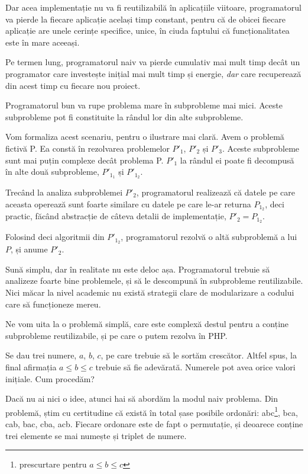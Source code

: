 Dar acea implementație nu va fi reutilizabilă în aplicațiile
viitoare, programatorul va pierde la fiecare aplicație
același timp constant, pentru că de obicei fiecare aplicație
are unele cerințe specifice, unice, în ciuda faptului că
funcționalitatea este în mare aceeași.

Pe termen lung, programatorul naiv va pierde cumulativ mai mult timp
decât un programator care investește inițial mai mult timp și
energie, \textit{dar} care recuperează din acest timp
cu fiecare nou proiect.

Programatorul bun va rupe problema mare în subprobleme mai mici.
Aceste subprobleme pot fi constituite la rândul lor din alte subprobleme.

Vom formaliza acest scenariu, pentru o ilustrare mai clară. Avem o problemă fictivă P.
Ea constă în rezolvarea problemelor $P'_1$, $P'_2$ și $P'_3$. Aceste subprobleme
sunt mai puțin complexe decât problema P. $P'_1$ la rândul ei poate fi decompusă în alte
două subprobleme, $P'_{1_1}$ și $P'_{1_2}$.

Trecând la analiza subproblemei $P'_2$, programatorul realizează că datele pe care
aceasta operează sunt foarte similare cu datele pe care le-ar returna $P_{1_2}$, deci
practic, făcând abstracție de câteva detalii de implementație, $P'_2 = P_{1_2}$.

Folosind deci algoritmii din $P'_{1_2}$, programatorul rezolvă o altă subproblemă a lui $P$,
și anume $P'_2$.


Sună simplu, dar în realitate nu este deloc așa. Programatorul trebuie să analizeze foarte
bine problemele, și să le descompună în subprobleme reutilizabile. Nici măcar la
nivel academic nu există strategii clare de modularizare a codului care să funcționeze mereu.

Ne vom uita la o problemă simplă, care este complexă destul pentru a conține subprobleme reutilizabile,
și pe care o putem rezolva în PHP.

Se dau trei numere, $a$, $b$, $c$, pe care trebuie să le sortăm crescător. Altfel spus, la final
afirmația $a \leq b \leq c$ trebuie să fie adevărată. Numerele pot avea orice valori inițiale.
Cum procedăm?

Dacă nu ai nici o idee, atunci hai să abordăm la modul naiv problema. Din problemă, știm
cu certitudine că
există în total șase posibile ordonări: abc\footnote{prescurtare pentru  $a \leq b \leq c$},
bca, cab, bac, cba, acb. Fiecare ordonare este de fapt o permutație, și deoarece conține trei
elemente se mai numește și triplet de numere.

